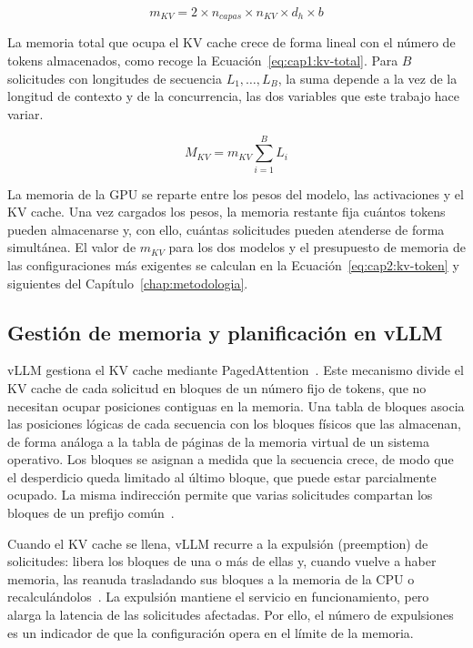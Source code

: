 \begin{equation}
\label{eq:cap1:kv-token}
m_{KV} = 2 \times n_{capas} \times n_{KV} \times d_h \times b
\end{equation}

La memoria total que ocupa el KV cache crece de forma lineal con el número de tokens almacenados, como recoge la Ecuación~\ref{eq:cap1:kv-total}. Para $B$ solicitudes con longitudes de secuencia $L_1, \dots, L_B$, la suma depende a la vez de la longitud de contexto y de la concurrencia, las dos variables que este trabajo hace variar.

\begin{equation}
\label{eq:cap1:kv-total}
M_{KV} = m_{KV} \sum_{i=1}^{B} L_i
\end{equation}

La memoria de la GPU se reparte entre los pesos del modelo, las activaciones y el KV cache. Una vez cargados los pesos, la memoria restante fija cuántos tokens pueden almacenarse y, con ello, cuántas solicitudes pueden atenderse de forma simultánea. El valor de $m_{KV}$ para los dos modelos y el presupuesto de memoria de las configuraciones más exigentes se calculan en la Ecuación~\ref{eq:cap2:kv-token} y siguientes del Capítulo~\ref{chap:metodologia}.

\subsection{Gestión de memoria y planificación en vLLM}
\label{sec:cap1:vllm}

vLLM gestiona el KV cache mediante PagedAttention~\cite{kwon2023pagedattention}. Este mecanismo divide el KV cache de cada solicitud en bloques de un número fijo de tokens, que no necesitan ocupar posiciones contiguas en la memoria. Una tabla de bloques asocia las posiciones lógicas de cada secuencia con los bloques físicos que las almacenan, de forma análoga a la tabla de páginas de la memoria virtual de un sistema operativo. Los bloques se asignan a medida que la secuencia crece, de modo que el desperdicio queda limitado al último bloque, que puede estar parcialmente ocupado. La misma indirección permite que varias solicitudes compartan los bloques de un prefijo común~\cite{kwon2023pagedattention}.

Cuando el KV cache se llena, vLLM recurre a la expulsión (preemption) de solicitudes: libera los bloques de una o más de ellas y, cuando vuelve a haber memoria, las reanuda trasladando sus bloques a la memoria de la CPU o recalculándolos~\cite{kwon2023pagedattention}. La expulsión mantiene el servicio en funcionamiento, pero alarga la latencia de las solicitudes afectadas. Por ello, el número de expulsiones es un indicador de que la configuración opera en el límite de la memoria.

